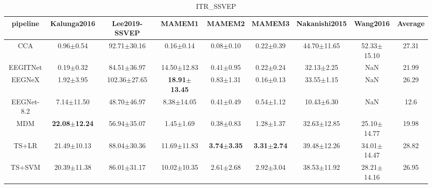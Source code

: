 \begin{table*}
\centering
\caption{ITR_SSVEP}
\label{tab:ITR_SSVEP_agg_dataset}
\begin{adjustbox}{width=\textwidth}
\begin{tabular}{c|ccccccc|c}
\toprule
      pipeline &                       Kalunga2016 &                      Lee2019-SSVEP &                            MAMEM1 &                          MAMEM2 &                          MAMEM3 &                    Nakanishi2015 &        Wang2016 &        Average \\
\midrule
           CCA &                     0.96$\pm$0.54 &                    92.71$\pm$30.16 &                     0.16$\pm$0.14 &                   0.08$\pm$0.10 &                   0.22$\pm$0.39 &                  44.70$\pm$11.65 & 52.33$\pm$15.10 &          27.31 \\
      EEGITNet &                     0.19$\pm$0.32 &                    84.51$\pm$36.97 &                   14.50$\pm$12.83 &                   0.41$\pm$0.95 &                   0.22$\pm$0.24 &                   32.13$\pm$2.25 &             NaN &          21.99 \\
        EEGNeX &                     1.92$\pm$3.95 &                   102.36$\pm$27.65 & \textbf{18.91}$\pm$\textbf{13.45} &                   0.83$\pm$1.31 &                   0.16$\pm$0.13 &                   33.55$\pm$1.15 &             NaN &          26.29 \\
    EEGNet-8.2 &                    7.14$\pm$11.50 &                    48.70$\pm$46.97 &                    8.38$\pm$14.05 &                   0.41$\pm$0.49 &                   0.54$\pm$1.12 &                   10.43$\pm$6.30 &             NaN &           12.6 \\
           MDM & \textbf{22.08}$\pm$\textbf{12.24} &                    56.94$\pm$35.07 &                     1.45$\pm$1.69 &                   0.38$\pm$0.83 &                   1.28$\pm$1.37 &                  32.63$\pm$12.85 & 25.10$\pm$14.77 &          19.98 \\
         TS+LR &                   21.49$\pm$10.13 &                    88.04$\pm$30.36 &                   11.69$\pm$11.83 & \textbf{3.74}$\pm$\textbf{3.35} & \textbf{3.31}$\pm$\textbf{2.74} &                  39.48$\pm$12.26 & 34.01$\pm$14.47 &          28.82 \\
        TS+SVM &                   20.39$\pm$11.38 &                    86.01$\pm$31.17 &                   10.02$\pm$10.35 &                   2.61$\pm$2.68 &                   2.92$\pm$3.04 &                  38.53$\pm$11.92 & 28.21$\pm$14.16 &          26.95 \\

\end{tabular}
\end{adjustbox}
\end{table*}

